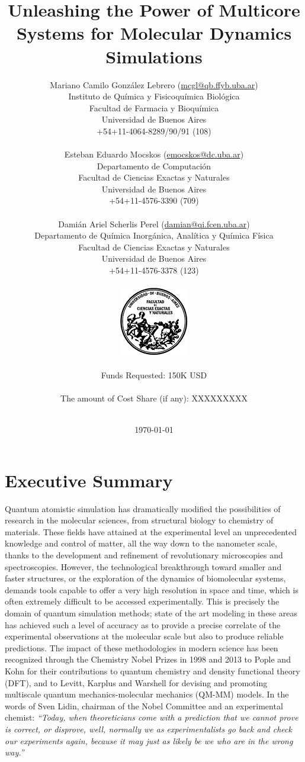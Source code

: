 \documentclass[a4paper,10pt]{article}
\title{\Huge Unleashing the Power of Multicore Systems for Molecular Dynamics Simulations}
\author{{\Large Mariano Camilo Gonz\'alez Lebrero} (\url{mcgl@qb.ffyb.uba.ar})\\
Instituto de Qu\'imica y Fisicoqu\'imica Biol\'ogica\\
Facultad de Farmacia y Bioqu\'imica\\
Universidad de Buenos Aires \\
+54+11-4064-8289/90/91 (108)\\
\\ 
{\Large Esteban Eduardo Mocskos} (\url{emocskos@dc.uba.ar})\\
Departamento de Computaci\'on\\
Facultad de Ciencias Exactas y Naturales\\
Universidad de Buenos Aires\\
+54+11-4576-3390 (709)\\
\\ 
{\Large Dami\'an Ariel Scherlis Perel} (\url{damian@qi.fcen.uba.ar})\\
Departamento de Qu\'imica Inorg\'anica, Anal\'itica y Qu\'imica F\'isica\\
Facultad de Ciencias Exactas y Naturales\\
Universidad de Buenos Aires\\
+54+11-4576-3378 (123)\\
\\
\includegraphics[keepaspectratio, width=3cm]{logofcen.pdf}\\
\\
Funds Requested: 150K USD \\
\\
The amount of Cost Share (if any): XXXXXXXXX\\
\\
}
\date{\today }
\begin{document}
\maketitle

\newpage

\section{Executive Summary}
% 

Quantum atomistic simulation has dramatically modified the possibilities of research in the molecular sciences, from structural biology to chemistry of materials. 
These fields have attained at the experimental level an unprecedented knowledge and control of matter, all the way down to the nanometer scale, thanks to the development and refinement of revolutionary microscopies and spectroscopies.
However, the technological breakthrough toward smaller and faster structures, or the exploration of the dynamics of biomolecular systems, demands tools capable to offer a very high resolution in space and time, which is often extremely difficult to be accessed experimentally. 
This is precisely the domain of quantum simulation methods; state of the art modeling in these areas has achieved such a level of accuracy as to provide a precise correlate of the experimental observations at the molecular scale but also to produce reliable predictions. 
The impact of these methodologies in modern science has been recognized through the Chemistry Nobel Prizes in 1998 and 2013 to Pople and Kohn for their contributions to quantum chemistry
and density functional theory (DFT), and to Levitt, Karplus and Warshell for devising and promoting multiscale quantum mechanics-molecular mechanics (QM-MM) models. 
In the words of Sven Lidin, chairman of the Nobel Committee and an experimental chemist: \textsl{``Today, when theoreticians come with a prediction that we cannot prove is correct, or
disprove, well, normally we as experimentalists go back and check our experiments again, because it may just as likely be we who are in the wrong way.''} 
\end{document}
